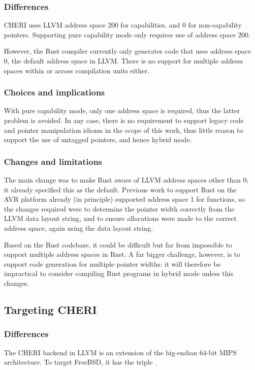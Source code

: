 \documentclass[dissertation.tex]{subfiles}
\begin{document}
\subsubsection{Differences}
CHERI uses LLVM address space 200 for capabilities, and 0 for
non-capability pointers.
Supporting pure capability mode only requires use of address space 200.

However, the Rust compiler currently only generates code that uses
address space 0, the default address space in LLVM.
There is no support for multiple address spaces within or across
compilation units either.

\subsubsection{Choices and implications}
With pure capability mode, only one address space is required, thus the
latter problem is avoided.
In any case, there is no requirement to support legacy code and pointer
manipulation idioms in the scope of this work, thus little reason to
support the use of untagged pointers, and hence hybrid mode.

\subsubsection{Changes and limitations}
The main change was to make Rust aware of LLVM address spaces other than
0; it already specified this as the default.
Previous work to support Rust on the AVR platform already (in principle)
supported address space 1 for functions, so the changes required were to
determine the pointer width correctly from the LLVM data layout string,
and to ensure allocations were made to the correct address space, again
using the data layout string.

Based on the Rust codebase, it could be difficult but far from
impossible to support multiple address spaces in Rust.
A far bigger challenge, however, is to support code generation for
multiple pointer widths: it will therefore be impractical to consider
compiling Rust programs in hybrid mode unless this changes.


\subsection{Targeting CHERI}
\label{sec:impl-cheritarget}

\subsubsection{Differences}
The CHERI backend in LLVM is an extension of the big-endian 64-bit MIPS
architecture.
To target FreeBSD, it has the triple \cuf.
\end{document}
